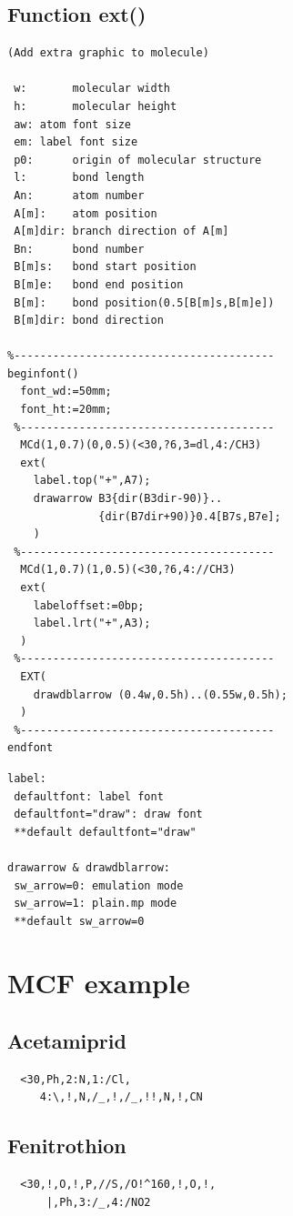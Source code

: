 \documentclass[a4paper]{article}
\makeatletter
\def\MCFstructure{\hspace{5mm}{\@strufont\char\fontnum}\advance\fontnum\@ne\relax}%
\makeatother
\begin{document}
\subsection{Function ext()}
\begin{verbatim}
(Add extra graphic to molecule)

 w:       molecular width
 h:       molecular height
 aw: atom font size
 em: label font size
 p0:      origin of molecular structure
 l:       bond length
 An:      atom number
 A[m]:    atom position
 A[m]dir: branch direction of A[m]
 Bn:      bond number
 B[m]s:   bond start position
 B[m]e:   bond end position
 B[m]:    bond position(0.5[B[m]s,B[m]e])
 B[m]dir: bond direction

%----------------------------------------
beginfont()
  font_wd:=50mm;
  font_ht:=20mm;
 %---------------------------------------
  MCd(1,0.7)(0,0.5)(<30,?6,3=dl,4:/CH3)
  ext(
    label.top("+",A7);
    drawarrow B3{dir(B3dir-90)}..
              {dir(B7dir+90)}0.4[B7s,B7e];
    )
 %---------------------------------------
  MCd(1,0.7)(1,0.5)(<30,?6,4://CH3)
  ext(
    labeloffset:=0bp;
    label.lrt("+",A3);
  )
 %---------------------------------------
  EXT(
    drawdblarrow (0.4w,0.5h)..(0.55w,0.5h);
  )
 %---------------------------------------
endfont
\end{verbatim}
\MCFstructure
\begin{verbatim}
label:
 defaultfont: label font
 defaultfont="draw": draw font
 **default defaultfont="draw"

drawarrow & drawdblarrow:
 sw_arrow=0: emulation mode
 sw_arrow=1: plain.mp mode
 **default sw_arrow=0
\end{verbatim}
\newpage
\section{MCF example}
\subsection{Acetamiprid}
\begin{verbatim}
  <30,Ph,2:N,1:/Cl,
     4:\,!,N,/_,!,/_,!!,N,!,CN
\end{verbatim}
\MCFstructure
\subsection{Fenitrothion}
\begin{verbatim}
  <30,!,O,!,P,//S,/O!^160,!,O,!,
      |,Ph,3:/_,4:/NO2
\end{verbatim}
\MCFstructure
\end{document}
